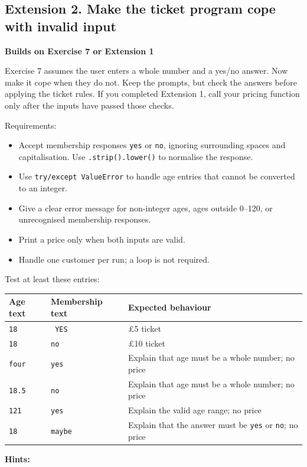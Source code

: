 \documentclass[12pt,a4paper]{article}
\begin{document}
\subsection*{Extension 2. Make the ticket program cope with invalid input}
\textbf{Builds on Exercise 7 or Extension 1}

Exercise 7 assumes the user enters a whole number and a yes/no answer. Now make it cope when they do not. Keep the prompts, but check the answers before applying the ticket rules. If you completed Extension 1, call your pricing function only after the inputs have passed those checks.

Requirements:

\begin{itemize}
\item Accept membership responses \texttt{yes} or \texttt{no}, ignoring surrounding spaces and capitalisation. Use \texttt{.strip().lower()} to normalise the response.
\item Use \texttt{try/except ValueError} to handle age entries that cannot be converted to an integer.
\item Give a clear error message for non-integer ages, ages outside 0–120, or unrecognised membership responses.
\item Print a price only when both inputs are valid.
\item Handle one customer per run; a loop is not required.
\end{itemize}
Test at least these entries:

\begingroup\small\renewcommand{\arraystretch}{1.3}\begin{longtable}{>{\raggedright\arraybackslash}p{}>{\raggedright\arraybackslash}p{}>{\raggedright\arraybackslash}p{}}
\toprule
\rowcolor{panel} Age text & Membership text & Expected behaviour \\ \midrule\endhead
\texttt{18} & \texttt{ YES } & £5 ticket \\
\texttt{18} & \texttt{no} & £10 ticket \\
\texttt{four} & \texttt{yes} & Explain that age must be a whole number; no price \\
\texttt{18.5} & \texttt{no} & Explain that age must be a whole number; no price \\
\texttt{121} & \texttt{yes} & Explain the valid age range; no price \\
\texttt{18} & \texttt{maybe} & Explain that the answer must be \texttt{yes} or \texttt{no}; no price \\
\bottomrule\end{longtable}\endgroup
\textbf{Hints:}
\end{document}
